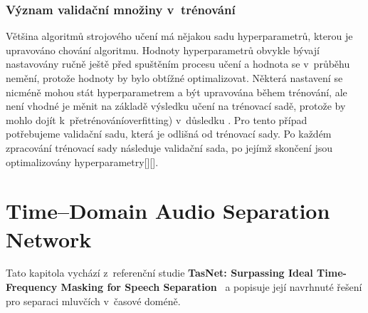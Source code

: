 \subsection{Význam validační množiny v~trénování}
Většina algoritmů strojového učení má nějakou sadu hyperparametrů, kterou je upravováno chování algoritmu. Hodnoty hyperparametrů obvykle bývají nastavovány ručně ještě před spuštěním procesu učení a hodnota se v~průběhu nemění, protože hodnoty by bylo obtížné optimalizovat. 
Některá nastavení se nicméně mohou stát hyperparametrem a být upravována během trénování, ale není vhodné je měnit na základě výsledku učení na trénovací sadě, protože by mohlo dojít k~přetrénováníoverfitting) v~důsledku . Pro tento případ potřebujeme validační sadu, která je odlišná od trénovací sady.
Po každém zpracování trénovací sady následuje validační sada, po jejímž skončení jsou optimalizovány hyperparametry[][].







\chapter{Time--Domain Audio Separation Network}
\label{tasnet}

Tato kapitola vychází z~referenční studie \textbf{TasNet: Surpassing Ideal Time-Frequency Masking for Speech Separation}~\cite{luo2018convtasnet} a popisuje její navrhnuté řešení pro separaci mluvčích v~časové doméně.

